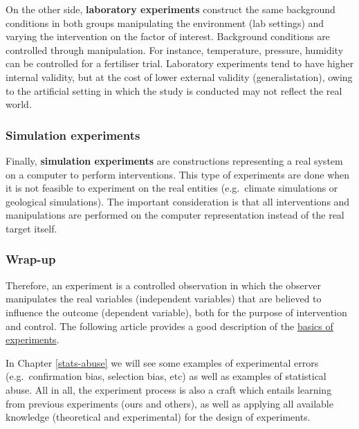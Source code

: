 \documentclass[
]{book}
\begin{document}
On the other side, \textbf{laboratory experiments} construct the same background conditions in both groups manipulating the environment (lab settings) and varying the intervention on the factor of interest. Background conditions are controlled through manipulation. For instance, temperature, pressure, humidity can be controlled for a fertiliser trial. Laboratory experiments tend to have higher internal validity, but at the cost of lower external validity (generalistation), owing to the artificial setting in which the study is conducted may not reflect the real world.

\hypertarget{simulation-experiments}{%
\subsubsection{Simulation experiments}\label{simulation-experiments}}

Finally, \textbf{simulation experiments} are constructions representing a real system on a computer to perform interventions. This type of experiments are done when it is not feasible to experiment on the real entities (e.g.~climate simulations or geological simulations). The important consideration is that all interventions and manipulations are performed on the computer representation instead of the real target itself.

\hypertarget{wrap-up}{%
\subsubsection{Wrap-up}\label{wrap-up}}

Therefore, an experiment is a controlled observation in which the observer manipulates the real variables (independent variables) that are believed to influence the outcome (dependent variable), both for the purpose of intervention and control. The following article provides a good description of the \href{https://opentextbc.ca/researchmethods/chapter/experiment-basics/}{basics of experiments}.

In Chapter \ref{stats-abuse} we will see some examples of experimental errors (e.g.~confirmation bias, selection bias, etc) as well as examples of statistical abuse. All in all, the experiment process is also a craft which entails learning from previous experiments (ours and others), as well as applying all available knowledge (theoretical and experimental) for the design of experiments.
\end{document}
